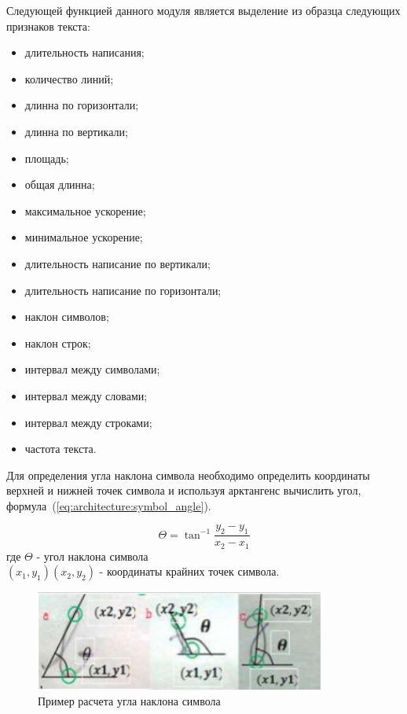 Следующей функцией данного модуля является выделение из образца следующих признаков текста:
\begin{itemize}
  \item длительность написания;
  \item количество линий;
  \item длинна по горизонтали;
  \item длинна по вертикали;
  \item площадь;
  \item общая длинна;
  \item максимальное ускорение;
  \item минимальное ускорение;
  \item длительность написание по вертикали;
  \item длительность написание по горизонтали;
  \item наклон символов;
  \item наклон строк;
  \item интервал между символами;
  \item интервал между словами;
  \item интервал между строками;
  \item частота текста.
\end{itemize}

Для определения угла наклона символа необходимо определить координаты верхней и нижней точек символа и используя арктангенс вычислить угол, формула~(\ref{eq:architecture:symbol_angle}).

\begin{equation}
  \label{eq:architecture:symbol_angle}
  \Theta = \tan^{-1}{\frac{y_2 - y_1}{x_2 - x_1}}
\end{equation}
где  $\Theta$ - угол наклона символа \\
     $ (x_1, y_1) (x_2, y_2) $  - координаты крайних точек символа.

\begin{figure}[ht]
    \centering
    \includegraphics[width=0.85\textwidth]{figures/char_angle.png}
    \caption{Пример расчета угла наклона символа}
    \label{fig:architecture:symbol_angle}
\end{figure}

